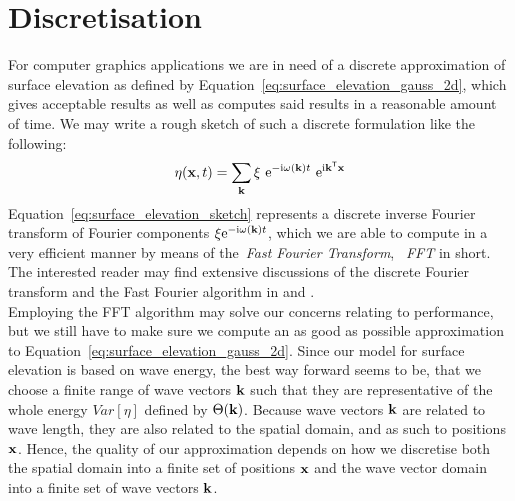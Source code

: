 \section{Discretisation}
\label{sec:random_sea_discretisation}
For computer graphics applications we are in need of a discrete approximation 
of surface elevation as defined by 
Equation~\ref{eq:surface_elevation_gauss_2d}, 
which gives acceptable results as well as computes said results in a reasonable 
amount of time. We may write a rough sketch of such a discrete formulation like 
the following:
\begin{equation}
\label{eq:surface_elevation_sketch}
 \eta(\mathbf{x}, t) = \sum_{\mathbf{k}} 
\xi~\mathrm{e}^{-\mathrm{i}\omega(\mathbf{k}) t}
~\mathrm{e}^{\mathrm{i}\mathbf{k}^{\mathsf{T}}\mathbf{x}}
\end{equation}
Equation~\ref{eq:surface_elevation_sketch} represents a discrete inverse 
Fourier transform of Fourier components 
$\xi\mathrm{e}^{-\mathrm{i}\omega(\mathbf{k}) t}$, which we are able to compute in 
a very efficient manner by means of the~\emph{Fast Fourier Transform}, 
~\emph{FFT} in short. The interested reader may find extensive discussions of 
the discrete Fourier transform and the Fast Fourier algorithm
in \cite{book:bracewell2000fourier} and \cite{book:numericalrecipes}.\\

Employing the FFT algorithm may solve our concerns relating to performance, but 
we still have to make sure we compute an as good as possible approximation to 
Equation~\ref{eq:surface_elevation_gauss_2d}. Since our model for surface 
elevation is based on wave energy, the best way forward seems to be, that we 
choose a finite range of wave vectors $\mathbf{k}$ such that they are 
representative of the whole energy $Var[\eta]$ defined by $\Theta(\mathbf{k})$. 
Because wave vectors $\mathbf{k}$ are related to wave length, they are also 
related to the spatial domain, and as such to positions $\mathbf{x}$. Hence, the 
quality of our approximation depends on how we discretise both the spatial 
domain into a finite set of positions $\mathbf{x}$ and the wave vector domain 
into a finite set of wave vectors $\mathbf{k}$.
%
